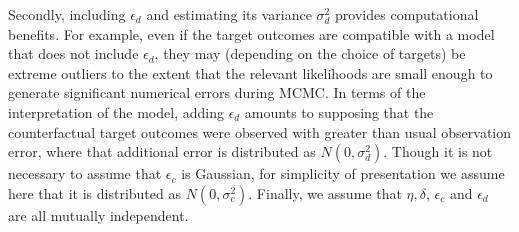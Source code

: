 \documentclass[12pt]{article}
\begin{document}
%
Secondly, including $\epsilon_d$ and estimating its variance $\sigma_d^2$ provides computational benefits.
%
For example, even if the target outcomes are compatible with a model that does not include $\epsilon_d$, they may (depending on the choice of targets) be extreme outliers to the extent that the relevant likelihoods are small enough to generate significant numerical errors during MCMC.
%
In terms of the interpretation of the model, adding $\epsilon_d$ amounts to supposing that the counterfactual target outcomes were observed with greater than usual observation error, where that additional error is distributed as $N(0,\sigma_d^2)$.
%
Though it is not necessary to assume that $\epsilon_c$ is Gaussian, for simplicity of presentation we assume here that it is distributed as $N(0,\sigma^2_c)$.
%
Finally, we assume that $\eta,\delta$, $\epsilon_c$ and $\epsilon_d$ are all mutually independent.
%
\end{document}
